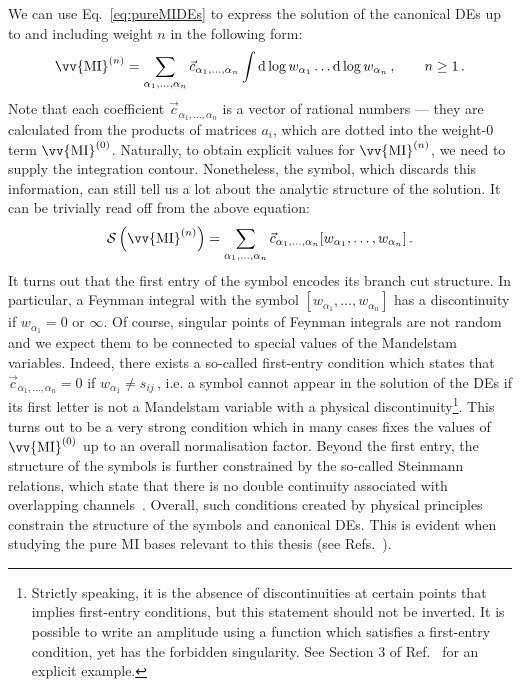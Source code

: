 \documentclass[main.tex]{subfiles}
\begin{document}
We can use Eq.~\ref{eq:pureMIDEs} to express the solution of the canonical DEs up to and including weight $n$ in the following form:
\begin{equation} \label{eq:pureMIDEsupton}
    \vv{\text{MI}}^{(n)} = \sum_{\alpha_1, \ldots, \alpha_n} \vec{c}_{\alpha_1, \ldots, \alpha_n} \int \dd \log w_{\alpha_1} \ldots \dd \log w_{\alpha_n}\,, \qquad n\ge1\,.
\end{equation}
Note that each coefficient $\vec{c}_{\alpha_1, \ldots, \alpha_n}$ is a vector of rational numbers --- they are calculated from the products of matrices $a_i$, which are dotted into the weight-0 term $\vv{\text{MI}}^{(0)}$. Naturally, to obtain explicit values for $\vv{\text{MI}}^{(n)}$, we need to supply the integration contour. Nonetheless, the symbol, which discards this information, can still tell us a lot about the analytic structure of the solution. It can be trivially read off from the above equation:
\begin{equation}
    \SS\left(\vv{\text{MI}}^{(n)}\right) = \sum_{\alpha_1, \ldots, \alpha_n} \vec{c}_{\alpha_1, \ldots, \alpha_n} [w_{\alpha_1}, \ldots, w_{\alpha_n}]\,.
\end{equation}
It turns out that the first entry of the symbol encodes its branch cut structure. In particular, a Feynman integral with the symbol $[w_{\alpha_1}, \ldots, w_{\alpha_n}]$ has a discontinuity if $w_{\alpha_1}=0$ or $\infty$. Of course, singular points of Feynman integrals are not random and we expect them to be connected to special values of the Mandelstam variables. Indeed, there exists a so-called first-entry condition which states that $\vec{c}_{\alpha_1, \ldots, \alpha_n}=0$ if $w_{\alpha_1} \neq s_{ij}\,$, i.e. a symbol cannot appear in the solution of the DEs if its first letter is not a Mandelstam variable with a physical discontinuity\footnote{Strictly speaking, it is the absence of discontinuities at certain points that implies first-entry conditions, but this statement should not be inverted. It is possible to write an amplitude using a function which satisfies a first-entry condition, yet has the forbidden singularity. See Section 3 of Ref.~\cite{Zoia:2021zmb} for an explicit example.}\cite{Gaiotto:2011dt}. This turns out to be a very strong condition which in many cases fixes the values of $\vv{\text{MI}}^{(0)}$ up to an overall normalisation factor. Beyond the first entry, the structure of the symbols is further constrained by the so-called Steinmann relations, which state that there is no double continuity associated with overlapping channels~\cite{20.500.11850/135473, Steinmann:1960, Caron-Huot:2016owq, Dixon:2016nkn}. Overall, such conditions created by physical principles constrain the structure of the symbols and canonical DEs. This is evident when studying the pure MI bases relevant to this thesis (see Refs.~\cite{Abreu:2020jxa, abreu2021twoloop}).
\renewcommand{\theequation}{C.\arabic{section}.\arabic{equation}}
\end{document}
